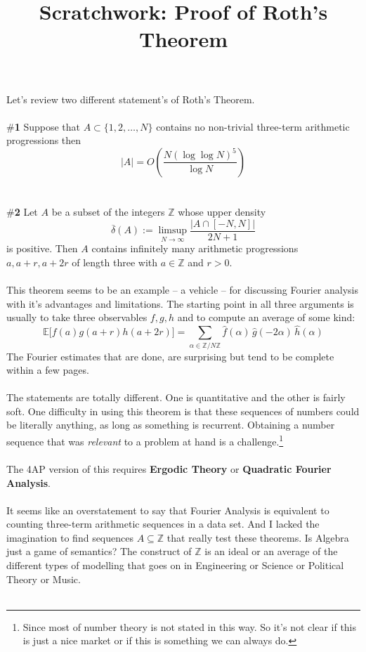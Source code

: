 \documentclass[12pt]{article}
\title{Scratchwork: Proof of Roth's Theorem}
\date{}
\begin{document}
\sffamily

\maketitle

\noindent Let's review two different statement's of Roth's Theorem. \\ \\
\#\textbf{1} Suppose that $A \subset \{ 1, 2, \dots, N \} $ contains no non-trivial three-term arithmetic progressions then 
$$ |A| = O \left( \frac{N (\log \log N)^5}{\log N} \right)  $$\\ \\
\#\textbf{2} Let $A$ be a subset of the integers $\mathbb{Z}$ whose upper density 
$$ \overline{\delta}(A) := \limsup_{N \to \infty} \frac{|A \cap [-N,N]|}{2N+1} $$ 
is positive.  Then $A$ contains infinitely many arithmetic progressions $a, a+r, a+2r$ of length
three with $a \in \mathbb{Z}$ and $r > 0$.\\ \\
This theorem seems to be an example -- a vehicle -- for discussing Fourier analysis with it's advantages and limitations.    The starting point in all three arguments is usually to take three observables $f,g,h$ and to compute an average of some kind:
$$ \mathbb{E} \big[f(a)g(a+r)h(a+2r)\big] = \sum_{\alpha \in \mathbb{Z}/N\mathbb{Z}}\widehat{f}(\alpha) \,\widehat{g}(-2\alpha)\,\widehat{h}(\alpha) $$
The Fourier estimates that are done, are surprising but tend to be complete within a few pages.  \\ \\
The statements are totally different.  One is quantitative and the other is fairly soft. One difficulty in using this theorem is that these sequences of numbers could be literally anything, as long as something is recurrent.  Obtaining a number sequence that was \textit{relevant} to a problem at hand is a challenge.\footnote{Since most of number theory is not stated in this way.  So it's not clear if this is just a nice market or if this is something we can always do.} \\ \\
The 4AP version of this requires \textbf{Ergodic Theory} or \textbf{Quadratic Fourier Analysis}. \\ \\
It seems like an overstatement to say that Fourier Analysis is equivalent to counting three-term arithmetic sequences in a data set.  And I lacked the imagination to find sequences $A \subseteq \mathbb{Z}$ that really test these theorems.  Is Algebra just a game of semantics?  The construct of $\mathbb{Z}$ is an ideal or an average of the different types of modelling that goes on in Engineering or Science or Political Theory or Music. \\ \\
\end{document}
